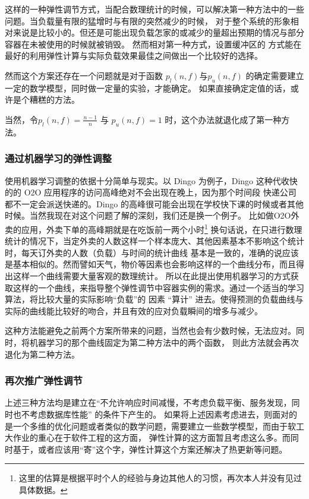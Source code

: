 这样的一种弹性调节方式，当配合数理统计的时候，可以解决第一种方法中的一些问题。当负载量有限的猛增时与有限的突然减少的时候，
对于整个系统的形象相对来说是比较小的。但还是可能出现负载怎家的或减少的量超出预期的情况与部分容器在未被使用的时候就被销毁。
然而相对第一种方式，设置缓冲区的 方式能在最好的利用弹性计算与实际负载效果最佳之间做出一个比较好的选择。

然而这个方案还存在一个问题就是对于函数 $p_l(n,f)$与$p_u(n,f)$ 的确定需要建立一定的数学模型，同时做一定量的实验，才能确定。
如果直接确定定值的话，或许是个糟糕的方法。

当然，令$p_l(n,f)=\frac{n-1}{n}$ 与 $p_u(n,f)=1$ 时，这个办法就退化成了第一种方法。
\subsubsection{通过机器学习的弹性调整}
使用机器学习调整的依据十分简单与现实。以 Dingo 为例子，Dingo 这种代收快的的 O2O 应用程序的访问高峰绝对不会出现在晚上，因为那个时间段
快递公司都不一定会派送快递的。Dingo 的高峰很可能会出现在学校快下课的时候或者其他时候。当然我现在对这个问题了解的深刻，我们还是换一个例子。
比如做O2O外卖的应用，外卖下单的高峰期就是在吃饭前一两个小时\footnote{这里的估算是根据平时个人的经验与身边其他人的习惯，再次本人并没有见过具体数据。}
换句话说，在只进行数理统计的情况下，当定外卖的人数这样一个样本庞大、其他因素基本不影响这个统计时，每天订外卖的人数（负载）与时间的统计曲线
基本是一致的，准确的说应该是基本相似的。然而譬如天气，物价等因素也会影响这样的一个曲线分布，而且得出这样一个曲线需要大量客观的数理统计。
所以在此提出使用机器学习的方式获取这样的一个曲线，来指导整个弹性调节中容器实例的需求。通过一个适当的学习算法，将比较大量的实际影响“负载”的
因素 “算计” 进去。使得预测的负载曲线与实际的曲线能比较好的吻合，并且有效的应对负载瞬间的增多与减少。

这种方法能避免之前两个方案所带来的问题，当然也会有少数时候，无法应对。同时，将机器学习的那个曲线固定为第二种方法中的两个函数，
则此方法就会再次退化为第二种方法。

\subsubsection{再次推广弹性调节}
上述三种方法均是建立在“不允许响应时间减慢，不考虑负载平衡、服务发现，同时也不考虑数据库性能” 的条件下产生的。
如果将上述因素考虑进去，则面对的是一个多维的优化问题或者类似的数学问题，需要建立一些数学模型，而由于软工大作业的重心在于软件工程的这方面，
弹性计算的这方面暂且考虑这么多。而同时基于，或者应该用“寄”这个字，弹性计算这个方案还解决了热更新等问题。

